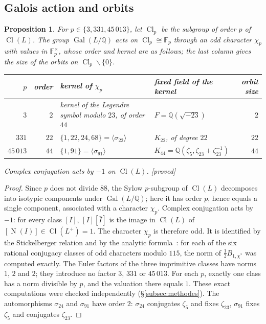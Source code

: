 \documentclass[11pt,a4paper]{amsart}
\theoremstyle{plain}
\newtheorem{proposition}[theorem]{Proposition}
\theoremstyle{definition}
\numberwithin{equation}{section}
\newcommand{\Q}{\mathbb{Q}}
\newcommand{\F}{\mathbb{F}}
\DeclareMathOperator{\Nm}{N}
\DeclareMathOperator{\Cl}{Cl}
\DeclareMathOperator{\Gal}{Gal}
\newcommand{\st}[1]{\textup{\textsf{\small[#1]}}}
\newcommand{\DEM}{\st{proved}}
\begin{document}
\subsection{Galois action and orbits}

\begin{proposition}\label{prop:car}
For $p\in\{3,331,45\,013\}$, let $\Cl_p$ be the subgroup of order $p$ of $\Cl(L)$. The group $\Gal(L/\Q)$ acts on $\Cl_p\cong\F_p$ through an odd character $\chi_p$ with values in $\F_p^\times$, whose order and kernel are as follows; the last column gives the size of the orbits on $\Cl_p\smallsetminus\{0\}$.
\begin{center}\small
\begin{tabular}{rr>{\raggedright\arraybackslash}p{4.3cm}>{\raggedright\arraybackslash}p{4.2cm}r}
\toprule
$p$ & order & kernel of $\chi_p$ & fixed field of the kernel & orbit size \\
\midrule
$3$ & $2$ & kernel of the Legendre symbol modulo $23$, of order $44$ & $F=\Q(\sqrt{-23})$ & $2$ \\
$331$ & $22$ & $\{1,22,24,68\}=\langle\sigma_{22}\rangle$ & $K_{22}$, of degree $22$ & $22$ \\
$45\,013$ & $44$ & $\{1,91\}=\langle\sigma_{91}\rangle$ & $K_{44}=\Q(\zeta_5,\zeta_{23}+\zeta_{23}^{-1})$ & $44$ \\
\bottomrule
\end{tabular}
\end{center}
Complex conjugation acts by $-1$ on $\Cl(L)$. \DEM
\end{proposition}

\begin{proof}
Since $p$ does not divide $88$, the Sylow $p$-subgroup of $\Cl(L)$ decomposes into isotypic components under $\Gal(L/\Q)$; here it has order $p$, hence equals a single component, associated with a character $\chi_p$. Complex conjugation acts by $-1$: for every class $[I]$, $[I][\bar I]$ is the image in $\Cl(L)$ of $[\Nm(I)]\in\Cl(L^+)=1$. The character $\chi_p$ is therefore odd. It is identified by the Stickelberger relation and by the analytic formula~\cite[Thm.~4.17 and Thm.~6.10]{Was97}: for each of the six rational conjugacy classes of odd characters modulo $115$, the norm of $\frac12B_{1,\chi^*}$ was computed exactly. The Euler factors of the three imprimitive classes have norms $1$, $2$ and $2$; they introduce no factor $3$, $331$ or $45\,013$. For each $p$, exactly one class has a norm divisible by $p$, and the valuation there equals $1$. These exact computations were checked independently (\S\ref{subsec:methodes}). The automorphisms $\sigma_{24}$ and $\sigma_{91}$ have order $2$: $\sigma_{24}$ conjugates $\zeta_5$ and fixes $\zeta_{23}$, $\sigma_{91}$ fixes $\zeta_5$ and conjugates $\zeta_{23}$.
\end{proof}
\end{document}
